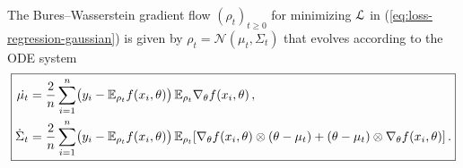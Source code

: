 \documentclass{custom}
\begin{document}
\begin{theorem}\label{thm:regression-gaussian}
    The Bures--Wasserstein
gradient flow $(\rho_{t})_{t\geq0}$ for minimizing $\EuScript{L}$ in (\ref{eq:loss-regression-gaussian})
is given by $\rho_{t}=\mathcal{N}(\mu_{t},\Sigma_{t})$ that evolves
according to the ODE system
\begin{align*}
\boxed{\begin{aligned}
\dot{\mu_{t}} & =\frac{2}{n}\sum_{i=1}^{n}\bigl(y_{i}-\mathbb{E}_{\rho_{t}} f(x_{i},\theta)\bigr)\,\mathbb E_{\rho_{t}}\nabla_{\theta}f(x_{i},\theta)\,,\\
\dot{\Sigma}_{t} & =\frac{2}{n}\sum_{i=1}^{n}\bigl(y_{i}-\mathbb{E}_{\rho_{t}}f(x_{i},\theta)\bigr)\,\mathbb E_{\rho_{t}}[\nabla_{\theta}f(x_{i},\theta)\otimes(\theta-\mu_{t})+(\theta-\mu_{t})\otimes\nabla_{\theta}f(x_{i},\theta)]\,.
\end{aligned}}
\end{align*}
\end{theorem}
\end{document}
